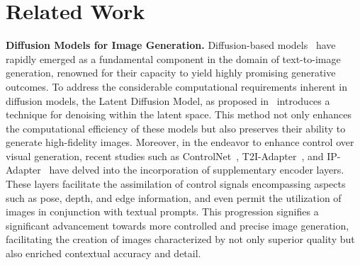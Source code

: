     


\section{Related Work}
\label{sec:related_work}

\textbf{Diffusion Models for Image Generation.}
Diffusion-based models~\cite{balaji2022ediffi,huang2023composer,nichol2021glide,ramesh2022hierarchical,rombach2022high,saharia2022photorealistic} have rapidly emerged as a fundamental component in the domain of text-to-image generation, renowned for their capacity to yield highly promising generative outcomes. 
To address the considerable computational requirements inherent in diffusion models, the Latent Diffusion Model, as proposed in~\cite{rombach2022high} introduces a technique for denoising within the latent space.
This method not only enhances the computational efficiency of these models but also preserves their ability to generate high-fidelity images.
Moreover, in the endeavor to enhance control over visual generation, recent studies such as ControlNet~\cite{zhang2023adding}, T2I-Adapter~\cite{mou2023t2i}, and IP-Adapter~\cite{ye2023ip} have delved into the incorporation of supplementary encoder layers.
These layers facilitate the assimilation of control signals encompassing aspects such as pose, depth, and edge information, and even permit the utilization of images in conjunction with textual prompts.
This progression signifies a significant advancement towards more controlled and precise image generation, facilitating the creation of images characterized by not only superior quality but also enriched contextual accuracy and detail.


